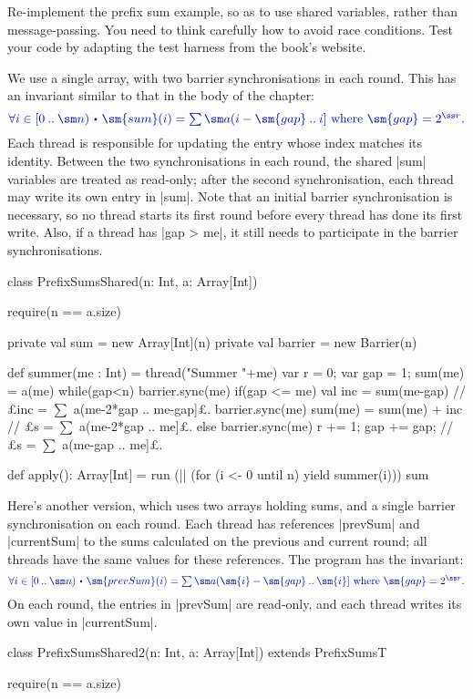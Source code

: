 \begin{question}
\label{ex:prefix-sums-shared}
Re-implement the prefix sum example, so as to use shared variables, rather
than message-passing.  You need to think carefully how to avoid race
conditions.  
%
Test your code by adapting the test harness from the book's website.
\end{question}


\begin{answerI}
We use a single array, with two barrier synchronisations in each round.  This
has an invariant similar to that in the body of the chapter:
\[\mstyle
\forall i \in \interval{0}{\sm n} \spot
  \sm{sum}(i) = \textstyle\sum \sm a(i-\sm{gap} \upto i]
   \mbox{ where } \sm{gap} = 2^{\ss r} .
\]
Each thread is responsible for updating the entry whose index matches its
identity.  Between the two synchronisations in each round, the shared |sum|
variables are treated as read-only; after the second synchronisation, each
thread may write its own entry in |sum|.  Note that an initial barrier
synchronisation is necessary, so no thread starts its first round before every
thread has done its first write.  Also, if a thread has |gap > me|, it still
needs to participate in the barrier synchronisations.
%
\begin{scala}
class PrefixSumsShared(n: Int, a: Array[Int]){
  require(n == a.size)

  private val sum = new Array[Int](n) 
  private val barrier = new Barrier(n)

  def summer(me : Int) = thread("Summer "+me){    
    var r = 0; var gap = 1; sum(me) = a(me)
    while(gap<n){ 
      barrier.sync(me)
      if(gap <= me){                
        val inc = sum(me-gap)    // £inc = $\sum$ a(me-2*gap .. me-gap]£.
        barrier.sync(me)
        sum(me) = sum(me) + inc  // £s = $\sum$ a(me-2*gap .. me]£.
      }
      else barrier.sync(me)
      r += 1; gap += gap;        // £s = $\sum$ a(me-gap .. me]£.
    }
  }

  def apply(): Array[Int] = {
    run (|| (for (i <- 0 until n) yield summer(i)))
    sum
  }
}
\end{scala}


Here's another version, which uses two arrays holding sums, and a single
barrier synchronisation on each round.  Each thread has references |prevSum|
and |currentSum| to the sums calculated on the previous and current round; all
threads have the same values for these references.  The program has the
invariant: 
\[\mstyle
\forall i \in \interval{0}{\sm n} \spot
  \sm{prevSum}(i) = \textstyle\sum \sm a(\sm{i}-\sm{gap} \upto \sm{i}]
   \mbox{ where } \sm{gap} = 2^{\ss r} .
\]
On each round, the entries in |prevSum| are read-only, and each thread writes
its own value in |currentSum|.
%
\begin{scala}
class PrefixSumsShared2(n: Int, a: Array[Int]) extends PrefixSumsT{
  require(n == a.size)

}
\end{scala}
\end{answerI}
